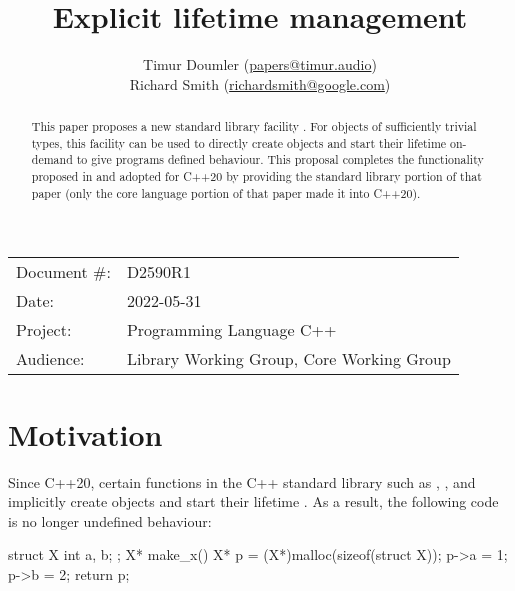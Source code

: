 

\newcommand{\forceindent}{\parindent=1em\indent\parindent=0pt\relax} %


\title{Explicit lifetime management}
\author{
  Timur Doumler \small(\href{mailto:papers@timur.audio}{papers@timur.audio}) \\
  Richard Smith \small(\href{mailto:richardsmith@google.com}{richardsmith@google.com})
}
\date{}
\maketitle

\begin{tabular}{ll}
Document \#: & D2590R1 \\
Date: & 2022-05-31\\
Project: & Programming Language C++ \\
Audience: & Library Working Group, Core Working Group
\end{tabular}


\begin{abstract}
This paper proposes a new standard library facility . For objects of sufficiently trivial types, this facility can be used to directly create objects and start their lifetime on-demand to give programs defined behaviour. This proposal completes the functionality  proposed in \cite{P0593R6} and adopted for C++20 by providing the standard library portion of that paper (only the core language portion of that paper made it into C++20).
\end{abstract}

\section{Motivation}
\label{sec:motivation}

Since C++20, certain functions in the C++ standard library such as , , and  implicitly create objects and start their lifetime \cite{P0593R6}. As a result, the following code is no longer undefined behaviour:

\begin{codeblock}
struct X { int a, b; };
X* make_x() {
  X* p = (X*)malloc(sizeof(struct X));
  p->a = 1;
  p->b = 2;
  return p;
}
\end{codeblock}

